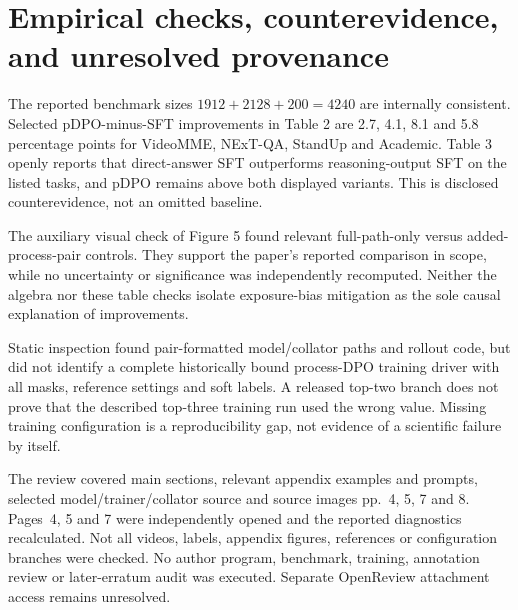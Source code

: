 \documentclass[10pt]{article}
\begin{document}
\section*{Empirical checks, counterevidence, and unresolved provenance}
The reported benchmark sizes \(1912+2128+200=4240\) are internally consistent. Selected pDPO-minus-SFT improvements in Table 2 are 2.7, 4.1, 8.1 and 5.8 percentage points for VideoMME, NExT-QA, StandUp and Academic. Table 3 openly reports that direct-answer SFT outperforms reasoning-output SFT on the listed tasks, and pDPO remains above both displayed variants. This is disclosed counterevidence, not an omitted baseline.\par
The auxiliary visual check of Figure 5 found relevant full-path-only versus added-process-pair controls. They support the paper’s reported comparison in scope, while no uncertainty or significance was independently recomputed. Neither the algebra nor these table checks isolate exposure-bias mitigation as the sole causal explanation of improvements.\par
Static inspection found pair-formatted model/collator paths and rollout code, but did not identify a complete historically bound process-DPO training driver with all masks, reference settings and soft labels. A released top-two branch does not prove that the described top-three training run used the wrong value. Missing training configuration is a reproducibility gap, not evidence of a scientific failure by itself.\par
The review covered main sections, relevant appendix examples and prompts, selected model/trainer/collator source and source images pp. 4, 5, 7 and 8. Pages 4, 5 and 7 were independently opened and the reported diagnostics recalculated. Not all videos, labels, appendix figures, references or configuration branches were checked. No author program, benchmark, training, annotation review or later-erratum audit was executed. Separate OpenReview attachment access remains unresolved.\par
\end{document}
